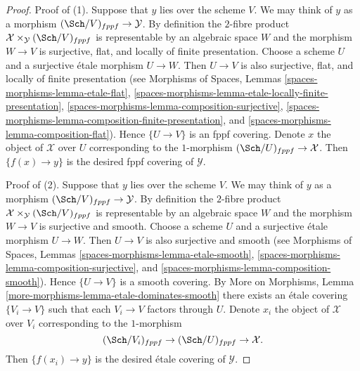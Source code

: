 \begin{proof}
Proof of (1). Suppose that $y$ lies over the scheme $V$.
We may think of $y$ as a morphism $(\Sch/V)_{fppf} \to \mathcal{Y}$.
By definition the $2$-fibre product
$\mathcal{X} \times_\mathcal{Y} (\Sch/V)_{fppf}$
is representable by an algebraic space $W$ and the morphism
$W \to V$ is surjective, flat, and locally of finite presentation.
Choose a scheme $U$ and a surjective \'etale morphism $U \to W$.
Then $U \to V$ is also surjective, flat, and locally of finite presentation
(see Morphisms of Spaces, Lemmas
\ref{spaces-morphisms-lemma-etale-flat},
\ref{spaces-morphisms-lemma-etale-locally-finite-presentation},
\ref{spaces-morphisms-lemma-composition-surjective},
\ref{spaces-morphisms-lemma-composition-finite-presentation}, and
\ref{spaces-morphisms-lemma-composition-flat}).
Hence $\{U \to V\}$ is an fppf covering. Denote $x$ the object of
$\mathcal{X}$ over $U$ corresponding to the $1$-morphism
$(\Sch/U)_{fppf} \to \mathcal{X}$. Then $\{f(x) \to y\}$ is
the desired fppf covering of $\mathcal{Y}$.

\medskip\noindent
Proof of (2). Suppose that $y$ lies over the scheme $V$.
We may think of $y$ as a morphism $(\Sch/V)_{fppf} \to \mathcal{Y}$.
By definition the $2$-fibre product
$\mathcal{X} \times_\mathcal{Y} (\Sch/V)_{fppf}$
is representable by an algebraic space $W$ and the morphism
$W \to V$ is surjective and smooth.
Choose a scheme $U$ and a surjective \'etale morphism $U \to W$.
Then $U \to V$ is also surjective and smooth
(see Morphisms of Spaces, Lemmas
\ref{spaces-morphisms-lemma-etale-smooth},
\ref{spaces-morphisms-lemma-composition-surjective}, and
\ref{spaces-morphisms-lemma-composition-smooth}).
Hence $\{U \to V\}$ is a smooth covering. By
More on Morphisms, Lemma \ref{more-morphisms-lemma-etale-dominates-smooth}
there exists an \'etale covering $\{V_i \to V\}$ such that
each $V_i \to V$ factors through $U$. Denote $x_i$ the object of
$\mathcal{X}$ over $V_i$ corresponding to the $1$-morphism
$$
(\Sch/V_i)_{fppf} \to (\Sch/U)_{fppf} \to \mathcal{X}.
$$
Then $\{f(x_i) \to y\}$ is
the desired \'etale covering of $\mathcal{Y}$.
\end{proof}

